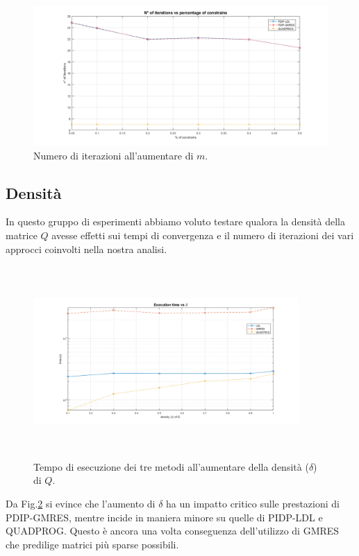 \begin{figure}[!h]
    \centering
    \includegraphics[width=\textwidth]{img/MU8.png}
    \caption{Numero di iterazioni all'aumentare di $m$. \label{fig:exp2.2}}
\end{figure}


\subsection{Densità}

 In questo gruppo di esperimenti abbiamo voluto testare qualora la densità della matrice $Q$ avesse effetti sui tempi di convergenza e il numero di iterazioni dei vari approcci coinvolti nella nostra analisi.

\begin{figure}[!h]
    \centering
    \includegraphics[width=0.9\textwidth, height=7.3cm]{img/MU4.png}
    \caption{Tempo di esecuzione dei tre metodi all'aumentare della densità ($\delta$) di $Q$. \label{fig:exp3.1}}
\end{figure}
 
Da Fig.\ref{fig:exp3.1} si evince che l'aumento di $\delta$ ha un impatto critico sulle prestazioni di PDIP-GMRES, mentre incide in maniera minore su quelle di PIDP-LDL e QUADPROG. Questo è ancora una volta conseguenza dell'utilizzo di GMRES che predilige matrici più sparse possibili. 

